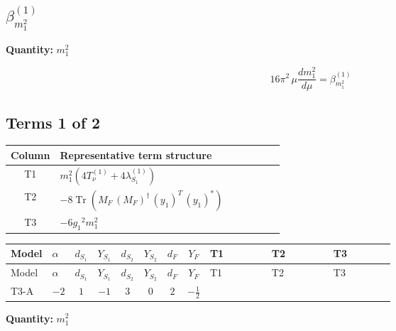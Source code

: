 \documentclass[8pt]{article}
\begin{document}
\begin{landscape}
\section*{$\beta_{m_1^2}^{(1)}$}
\noindent\textbf{Quantity: }$m_1^2$\par\smallskip
\[16\pi^2\,\mu\frac{d m_1^2}{d\mu}=\beta_{m_1^2}^{(1)}\]
\subsection*{Terms 1 of 2}
\begin{center}
\begin{tabular}{@{}c >{\raggedright\arraybackslash}p{0.82\linewidth}@{}}
\toprule
Column & Representative term structure \\
\midrule
T1 & \(\displaystyle {m_1^2} (4 T_{\nu}^{(1)}+4 {\lambda_{S_1}^{(1)}})\) \\
\midrule
T2 & \(\displaystyle -8 \operatorname{Tr}\!\left({M_F}\,\left({M_F}\right)^{\dagger}\,\left({y_1}\right)^{T}\,\left({y_1}\right)^{*}\right)\) \\
\midrule
T3 & \(\displaystyle -6 {g_1}^2 {m_1^2}\) \\
\midrule
\bottomrule
\end{tabular}
\end{center}
\smallskip
\tiny
\begin{longtable}{@{}llcccccc >{\raggedright\arraybackslash}p{0.21\linewidth} >{\raggedright\arraybackslash}p{0.21\linewidth} >{\raggedright\arraybackslash}p{0.21\linewidth}@{}}
\toprule
Model & $\alpha$ & $d_{S_1}$ & $Y_{S_1}$ & $d_{S_2}$ & $Y_{S_2}$ & $d_F$ & $Y_F$ & T1 & T2 & T3 \\
\midrule
\endfirsthead
\toprule
Model & $\alpha$ & $d_{S_1}$ & $Y_{S_1}$ & $d_{S_2}$ & $Y_{S_2}$ & $d_F$ & $Y_F$ & T1 & T2 & T3 \\
\midrule
\endhead
T3-A & $-2$ & $1$ & $-1$ & $3$ & $0$ & $2$ & $-\frac{1}{2}$ & \scriptsize\adjustbox{max width=\linewidth}{$\begin{gathered} {m_1^2} (4 T_{\nu}^{(1)}+4 {\lambda_{S_1}^{(1)}})\end{gathered}$} & \scriptsize\adjustbox{max width=\linewidth}{$\begin{gathered} -8 \operatorname{Tr}\!\left({M_F}\,\left({M_F}\right)^{\dagger}\,\left({y_1}\right)^{T}\,\left({y_1}\right)^{*}\right)\end{gathered}$} & \scriptsize\adjustbox{max width=\linewidth}{$\begin{gathered} -6 {g_1}^2 {m_1^2}\end{gathered}$} \\
\midrule
\bottomrule
\end{longtable}
\clearpage
\noindent\textbf{Quantity: }$m_1^2$\par\smallskip

\end{landscape}
\end{document}
